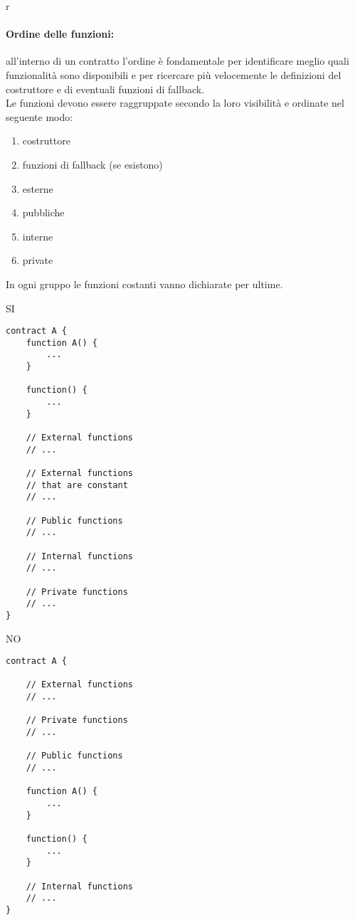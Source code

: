r\documentclass[../ProcessiPrimari.tex]{subfiles}
\begin{document}
\paragraph*{Ordine delle funzioni: }
all'interno di un contratto l'ordine è fondamentale per identificare meglio quali funzionalità sono disponibili e per ricercare più velocemente le definizioni del costruttore e di eventuali funzioni di fallback.\\
Le funzioni devono essere raggruppate secondo la loro visibilità e ordinate nel seguente modo:
\begin{enumerate}
\item costruttore
\item funzioni di fallback (se esistono)
\item esterne
\item pubbliche
\item interne
\item private
\end{enumerate}
In ogni gruppo le funzioni costanti vanno dichiarate per ultime.
\begin{center}{
\begin{minipage}{6cm}
{\begin{center}SI\end{center}}
\begin{Verbatim}[frame=single]
contract A {
    function A() {
        ...
    }

    function() {
        ...
    }

    // External functions
    // ...

    // External functions 
    // that are constant
    // ...

    // Public functions
    // ...

    // Internal functions
    // ...

    // Private functions
    // ...
}
\end{Verbatim}
\end{minipage}
\hfill
\begin{minipage}{6cm}
{\begin{center}NO\end{center}}
\begin{Verbatim}[frame=single]
contract A {

    // External functions
    // ...

    // Private functions
    // ...

    // Public functions
    // ...

    function A() {
        ...
    }

    function() {
        ...
    }

    // Internal functions
    // ...
}



\end{Verbatim}
\end{minipage}
}
\end{center}
\end{document}
